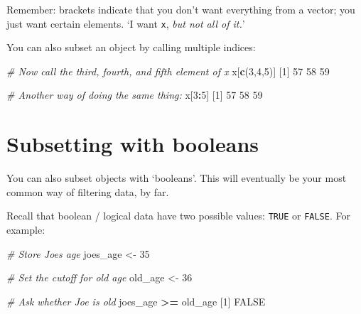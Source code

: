 \documentclass[
]{book}
\newenvironment{Shaded}{\begin{snugshade}}{\end{snugshade}}
\newcommand{\CommentTok}[1]{\textcolor[rgb]{0.56,0.35,0.01}{\textit{#1}}}
\newcommand{\ConstantTok}[1]{\textcolor[rgb]{0.56,0.35,0.01}{#1}}
\newcommand{\DecValTok}[1]{\textcolor[rgb]{0.00,0.00,0.81}{#1}}
\newcommand{\FunctionTok}[1]{\textcolor[rgb]{0.13,0.29,0.53}{\textbf{#1}}}
\newcommand{\NormalTok}[1]{#1}
\newcommand{\OtherTok}[1]{\textcolor[rgb]{0.56,0.35,0.01}{#1}}
\newcommand{\SpecialCharTok}[1]{\textcolor[rgb]{0.81,0.36,0.00}{\textbf{#1}}}
\begin{document}
Remember: brackets indicate that you don't want everything from a vector; you just want certain elements. `I want \texttt{x}, \emph{but not all of it.}'

You can also subset an object by calling multiple indices:

\begin{Shaded}
\begin{Highlighting}[]
\CommentTok{\# Now call the third, fourth, and fifth element of x}
\NormalTok{x[}\FunctionTok{c}\NormalTok{(}\DecValTok{3}\NormalTok{,}\DecValTok{4}\NormalTok{,}\DecValTok{5}\NormalTok{)]}
\NormalTok{[}\DecValTok{1}\NormalTok{] }\DecValTok{57} \DecValTok{58} \DecValTok{59}
\end{Highlighting}
\end{Shaded}

\begin{Shaded}
\begin{Highlighting}[]
\CommentTok{\# Another way of doing the same thing:}
\NormalTok{x[}\DecValTok{3}\SpecialCharTok{:}\DecValTok{5}\NormalTok{]}
\NormalTok{[}\DecValTok{1}\NormalTok{] }\DecValTok{57} \DecValTok{58} \DecValTok{59}
\end{Highlighting}
\end{Shaded}

\section*{Subsetting with booleans}\label{subsetting-with-booleans}

You can also subset objects with `booleans'. This will eventually be your most common way of filtering data, by far.

Recall that boolean / logical data have two possible values: \texttt{TRUE} or \texttt{FALSE}. For example:

\begin{Shaded}
\begin{Highlighting}[]
\CommentTok{\# Store Joe\textquotesingle{}s age}
\NormalTok{joes\_age }\OtherTok{\textless{}{-}} \DecValTok{35}

\CommentTok{\# Set the cutoff for old age}
\NormalTok{old\_age }\OtherTok{\textless{}{-}} \DecValTok{36}

\CommentTok{\# Ask whether Joe is old}
\NormalTok{joes\_age }\SpecialCharTok{\textgreater{}=}\NormalTok{ old\_age}
\NormalTok{[}\DecValTok{1}\NormalTok{] }\ConstantTok{FALSE}
\end{Highlighting}
\end{Shaded}
\end{document}
